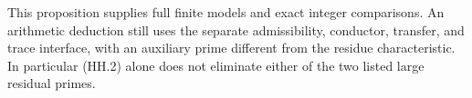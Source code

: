 This proposition supplies full finite models and exact integer
comparisons. An arithmetic deduction still uses the separate
admissibility, conductor, transfer, and trace interface, with an
auxiliary prime different from the residue characteristic. In
particular (HH.2) alone does not eliminate either of the two listed
large residual primes.
